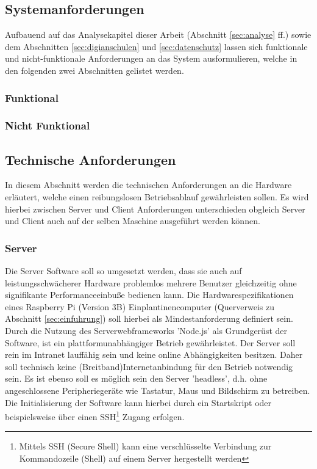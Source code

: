 \subsection{Systemanforderungen}\label{sec:anforderung}
Aufbauend auf das Analysekapitel dieser Arbeit (Abschnitt \ref{sec:analyse} ff.) sowie dem Abschnitten \ref{sec:digianschulen} und \ref{sec:datenschutz} lassen sich funktionale und nicht-funktionale Anforderungen an das System ausformulieren, welche in den folgenden zwei Abschnitten gelistet werden.

\subsubsection{Funktional}\label{sec:anffunc}

\subsubsection{Nicht Funktional}\label{sec:nichtfunc}
\subsection{Technische Anforderungen}\label{sec:techanford}
In diesem Abschnitt werden die technischen Anforderungen an die Hardware erläutert, welche einen reibungslosen Betriebsablauf gewährleisten sollen. Es wird hierbei zwischen Server und Client Anforderungen unterschieden obgleich Server und Client auch auf der selben Maschine ausgeführt werden können. 
\subsubsection{Server}\label{sec:servertech}
Die Server Software soll so umgesetzt werden, dass sie auch auf leistungsschwächerer Hardware problemlos mehrere Benutzer gleichzeitig ohne signifikante Performanceeinbuße bedienen kann. Die Hardwarespezifikationen eines Raspberry Pi (Version 3B) Einplantinencomputer (Querverweis zu Abschnitt \ref{sec:einfuhrung}) soll hierbei als Mindestanforderung definiert sein. Durch die Nutzung des Serverwebframeworks 'Node.js' als Grundgerüst der Software, ist ein plattformunabhängiger Betrieb gewährleistet. Der Server soll rein im Intranet lauffähig sein und keine online Abhängigkeiten besitzen. Daher soll technisch keine (Breitband)Internetanbindung für den Betrieb notwendig sein. Es ist ebenso soll es möglich sein den Server 'headless', d.h. ohne angeschlossene Peripheriegeräte wie Tastatur, Maus und Bildschirm zu betreiben. Die Initialisierung der Software kann hierbei durch ein Startskript oder beispielsweise über einen SSH\footnote{Mittels SSH (Secure Shell) kann eine verschlüsselte Verbindung zur Kommandozeile (Shell) auf einem Server hergestellt werden} Zugang erfolgen.
